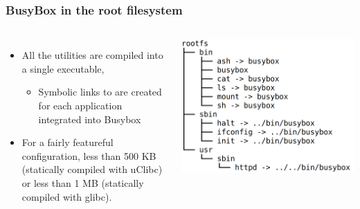 \begin{frame}
  \frametitle{BusyBox in the root filesystem}
  \begin{columns}
      \begin{itemize}
      \item All the utilities are compiled into a single executable,
        \begin{itemize}
        \item Symbolic links to  are created for each
          application integrated into Busybox
        \end{itemize}
      \item For a fairly featureful configuration, less than 500 KB
        (statically compiled with uClibc) or less than 1 MB (statically
        compiled with glibc).
      \end{itemize}
      \includegraphics[width=\textwidth]{slides/sysdev-busybox/busybox-tree.png}
  \end{columns}
\end{frame}

